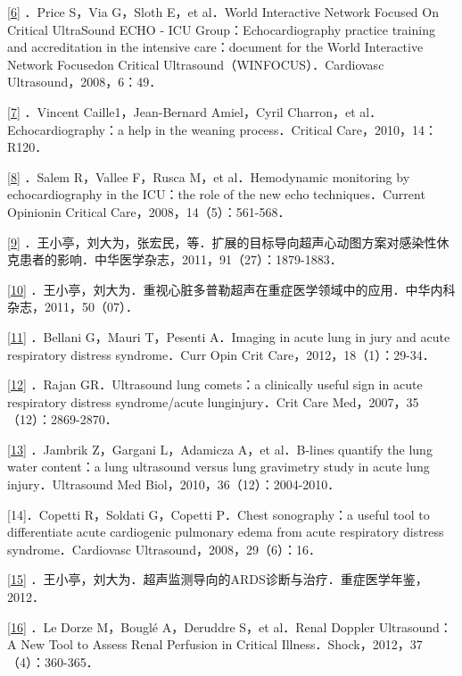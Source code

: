 \protect\hyperlink{text00009.htmlux5cux23ch6-8-back}{{[}6{]}} ．Price
S，Via G，Sloth E，et al．World Interactive Network Focused On Critical
UltraSound ECHO - ICU Group：Echocardiography practice training and
accreditation in the intensive care：document for the World Interactive
Network Focusedon Critical Ultrasound（WINFOCUS）．Cardiovasc
Ultrasound，2008，6：49．

\protect\hyperlink{text00009.htmlux5cux23ch7-8-back}{{[}7{]}} ．Vincent
Caille1，Jean-Bernard Amiel，Cyril Charron，et al．Echocardiography：a
help in the weaning process．Critical Care，2010，14：R120．

\protect\hyperlink{text00009.htmlux5cux23ch8-8-back}{{[}8{]}} ．Salem
R，Vallee F，Rusca M，et al．Hemodynamic monitoring by echocardiography
in the ICU：the role of the new echo techniques．Current Opinionin
Critical Care，2008，14（5）：561-568．

\protect\hyperlink{text00009.htmlux5cux23ch9-8-back}{{[}9{]}}
．王小亭，刘大为，张宏民，等．扩展的目标导向超声心动图方案对感染性休克患者的影响．中华医学杂志，2011，91（27）：1879-1883．

\protect\hyperlink{text00009.htmlux5cux23ch10-8-back}{{[}10{]}}
．王小亭，刘大为．重视心脏多普勒超声在重症医学领域中的应用．中华内科杂志，2011，50（07）．

\protect\hyperlink{text00009.htmlux5cux23ch11-8-back}{{[}11{]}}
．Bellani G，Mauri T，Pesenti A．Imaging in acute lung in jury and acute
respiratory distress syndrome．Curr Opin Crit
Care，2012，18（1）：29-34．

\protect\hyperlink{text00009.htmlux5cux23ch12-8-back}{{[}12{]}} ．Rajan
GR．Ultrasound lung comets：a clinically useful sign in acute
respiratory distress syndrome/acute lunginjury．Crit Care
Med，2007，35（12）：2869-2870．

\protect\hyperlink{text00009.htmlux5cux23ch13-8-back}{{[}13{]}}
．Jambrik Z，Gargani L，Adamicza A，et al．B-lines quantify the lung
water content：a lung ultrasound versus lung gravimetry study in acute
lung injury．Ultrasound Med Biol，2010，36（12）：2004-2010．

{[}14{]}．Copetti R，Soldati G，Copetti P．Chest sonography：a useful
tool to differentiate acute cardiogenic pulmonary edema from acute
respiratory distress syndrome．Cardiovasc
Ultrasound，2008，29（6）：16．

\protect\hyperlink{text00009.htmlux5cux23ch15-8-back}{{[}15{]}}
．王小亭，刘大为．超声监测导向的ARDS诊断与治疗．重症医学年鉴，2012．

\protect\hyperlink{text00009.htmlux5cux23ch16-8-back}{{[}16{]}} ．Le
Dorze M，Bouglé A，Deruddre S，et al．Renal Doppler Ultrasound：A New
Tool to Assess Renal Perfusion in Critical
Illness．Shock，2012，37（4）：360-365．

\protect\hypertarget{text00010.html}{}{}

